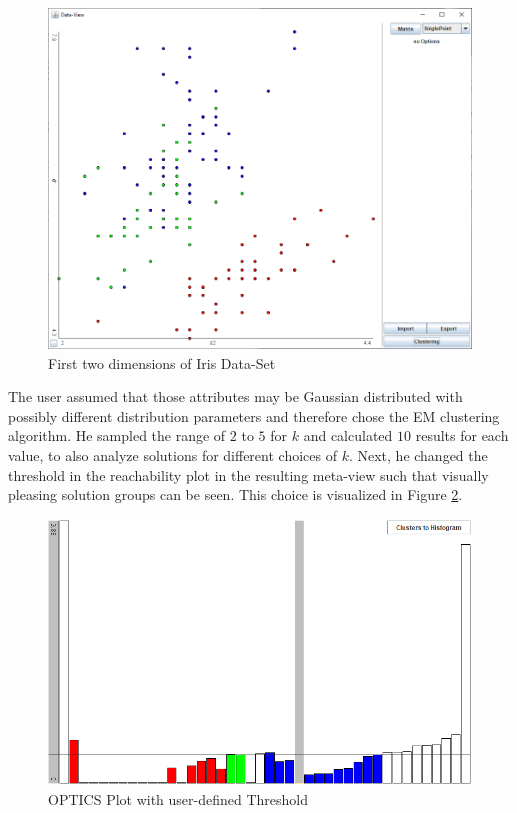 \documentclass[
	a4paper,
	english,
	twoside,
	openright,               
	11pt                            
	]{report}
\begin{document}
\begin{figure}[h]
	\centering
	\includegraphics[scale=.5]{iris2}
	\caption{First two dimensions of Iris Data-Set}
	\label{fig:iris}
\end{figure}

The user assumed that those attributes may be Gaussian distributed with possibly different distribution parameters and therefore chose the EM clustering algorithm. He sampled the range of $2$ to $5$ for $k$ and calculated $10$ results for each value, to also analyze solutions for different choices of $k$. Next, he changed the threshold in the reachability plot in the resulting meta-view such that visually pleasing solution groups can be seen. This choice is visualized in Figure \ref{fig:user_iris_optics}.

\begin{figure}[h]
	\centering
	\includegraphics[scale=.6]{user_iris_optics}
	\caption{OPTICS Plot with user-defined Threshold}
	\label{fig:user_iris_optics}
\end{figure}
\end{document}
